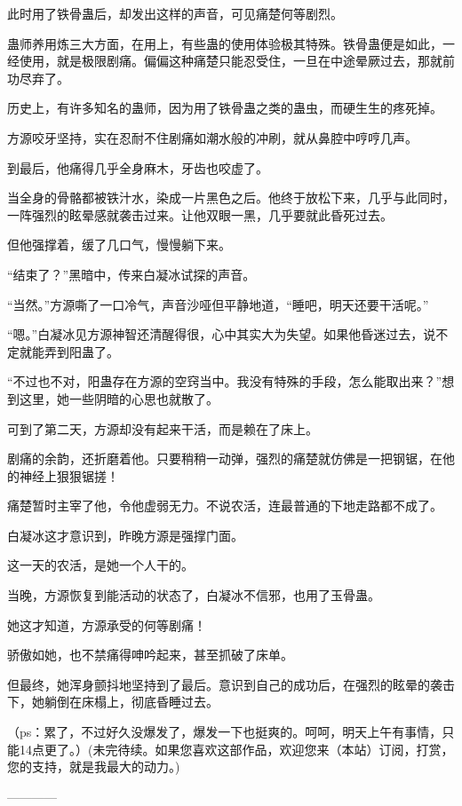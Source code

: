 \begin{this_body}
此时用了铁骨蛊后，却发出这样的声音，可见痛楚何等剧烈。

蛊师养用炼三大方面，在用上，有些蛊的使用体验极其特殊。铁骨蛊便是如此，一经使用，就是极限剧痛。偏偏这种痛楚只能忍受住，一旦在中途晕厥过去，那就前功尽弃了。

历史上，有许多知名的蛊师，因为用了铁骨蛊之类的蛊虫，而硬生生的疼死掉。

方源咬牙坚持，实在忍耐不住剧痛如潮水般的冲刷，就从鼻腔中哼哼几声。

到最后，他痛得几乎全身麻木，牙齿也咬虚了。

当全身的骨骼都被铁汁水，染成一片黑色之后。他终于放松下来，几乎与此同时，一阵强烈的眩晕感就袭击过来。让他双眼一黑，几乎要就此昏死过去。

但他强撑着，缓了几口气，慢慢躺下来。

“结束了？”黑暗中，传来白凝冰试探的声音。

“当然。”方源嘶了一口冷气，声音沙哑但平静地道，“睡吧，明天还要干活呢。”

“嗯。”白凝冰见方源神智还清醒得很，心中其实大为失望。如果他昏迷过去，说不定就能弄到阳蛊了。

“不过也不对，阳蛊存在方源的空窍当中。我没有特殊的手段，怎么能取出来？”想到这里，她一些阴暗的心思也就散了。

可到了第二天，方源却没有起来干活，而是赖在了床上。

剧痛的余韵，还折磨着他。只要稍稍一动弹，强烈的痛楚就仿佛是一把钢锯，在他的神经上狠狠锯搓！

痛楚暂时主宰了他，令他虚弱无力。不说农活，连最普通的下地走路都不成了。

白凝冰这才意识到，昨晚方源是强撑门面。

这一天的农活，是她一个人干的。

当晚，方源恢复到能活动的状态了，白凝冰不信邪，也用了玉骨蛊。

她这才知道，方源承受的何等剧痛！

骄傲如她，也不禁痛得呻吟起来，甚至抓破了床单。

但最终，她浑身颤抖地坚持到了最后。意识到自己的成功后，在强烈的眩晕的袭击下，她躺倒在床榻上，彻底昏睡过去。

（ps：累了，不过好久没爆发了，爆发一下也挺爽的。呵呵，明天上午有事情，只能14点更了。）(未完待续。如果您喜欢这部作品，欢迎您来（本站）订阅，打赏，您的支持，就是我最大的动力。)

------------

\end{this_body}


